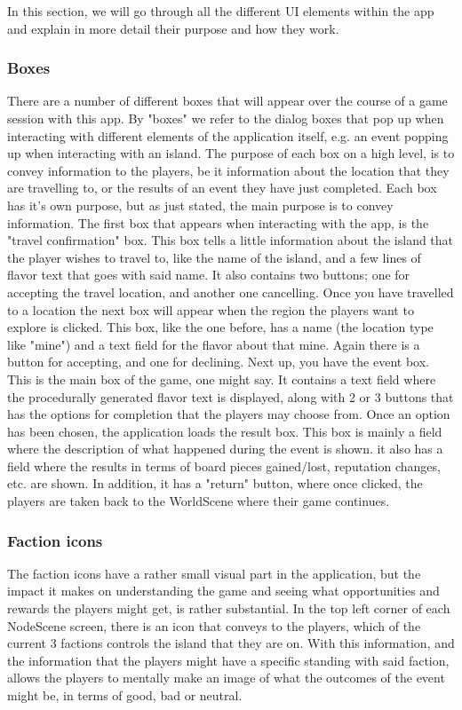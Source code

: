 In this section, we will go through all the different UI elements within the app and explain in more detail their purpose and how they work.

\subsubsection{Boxes}

There are a number of different boxes that will appear over the course of a game session with this app. By "boxes" we refer to the dialog boxes that pop up when interacting with different elements of the application itself, e.g. an event popping up when interacting with an island.
The purpose of each box on a high level, is to convey information to the players, be it information about the location that they are travelling to, or the results of an event they have just completed.
Each box has it's own purpose, but as just stated, the main purpose is to convey information. The first box that appears when interacting with the app, is the "travel confirmation" box. This box tells a little information about the island that the player wishes to travel to, like the name of the island, and a few lines of flavor text that goes with said name. It also contains two buttons; one for accepting the travel location, and another one cancelling.
Once you have travelled to a location the next box will appear when the region the players want to explore is clicked. This box, like the one before, has a name (the location type like "mine") and a text field for the flavor about that mine. Again there is a button for accepting, and one for declining. 
Next up, you have the event box. This is the main box of the game, one might say. It contains a text field where the procedurally generated flavor text is displayed, along with 2 or 3 buttons that has the options for completion that the players may choose from. 
Once an option has been chosen, the application loads the result box. This box is mainly a field where the description of what happened during the event is shown. it also has a field where the results in terms of board pieces gained/lost, reputation changes, etc. are shown. In addition, it has a "return" button, where once clicked, the players are taken back to the WorldScene where their game continues.


\subsubsection{Faction icons}

The faction icons have a rather small visual part in the application, but the impact it makes on understanding the game and seeing what opportunities and rewards the players might get, is rather substantial. In the top left corner of each NodeScene screen, there is an icon that conveys to the players, which of the current 3 factions controls the island that they are on. With this information, and the information that the players might have a specific standing with said faction, allows the players to mentally make an image of what the outcomes of the event might be, in terms of good, bad or neutral.

